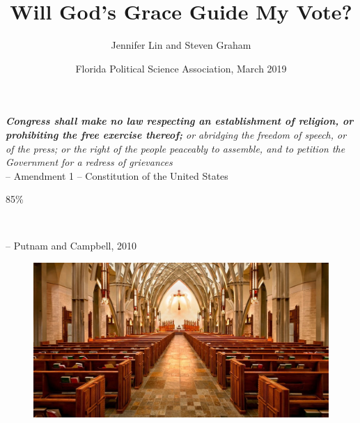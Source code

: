 \documentclass[14pt]{beamer}
\newcommand\e{\emph}
\newcommand\tb{\textbf}
\begin{document}
\author[Lin, J., and Graham, S.] %
{Jennifer Lin and Steven Graham}
	\title{Will God’s Grace Guide My Vote?}
		
	\date[FPSA 2019]{Florida Political Science Association, March 2019}
	\begin{frame}[plain]
	\maketitle
\end{frame}

\begin{frame}
\begin{center}
	\e{\tb{Congress shall make no law respecting an establishment of religion, or prohibiting the free exercise thereof;} or abridging the freedom of speech, or of the press; or the right of the people peaceably to assemble, and to petition the Government for a redress of grievances} \\
	-- Amendment 1 -- Constitution of the United States
\end{center}
\end{frame}

\begin{frame}
\begin{center}
\begin{Huge}
	85\%
\end{Huge} \\
\begin{footnotesize}
	-- Putnam and Campbell, 2010
\end{footnotesize}
\end{center}
\end{frame}

\begin{frame}
\begin{figure}
		\centering
	{\includegraphics[width=\textwidth]{church}}
\end{figure}
\end{frame}
\end{document}

